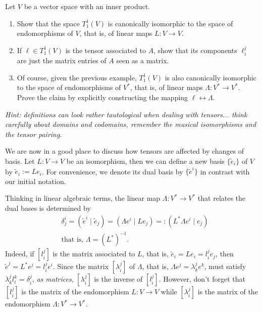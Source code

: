 \begin{exercise}
  Let $V$ be a vector space with an inner product.
  \begin{enumerate}
    \item Show that the space $T^1_1(V)$ is canonically isomorphic to the space of endomorphisms of $V$, that is, of linear maps $L:V\to V$.

    \item If $\ell\in T^1_1(V)$ is the tensor associated to $A$, show that its components $\ell_i^j$ are just the matrix entries of $A$ seen as a matrix.
  
    \item Of course, given the previous example, $T^1_1(V)$ is also canonically isomorphic to the space of endomorphisms of $V^*$, that is, of linear maps $\Lambda:V^*\to V^*$.
    Prove the claim by explicitly constructing the mapping $\ell \leftrightarrow \Lambda$.
  \end{enumerate}
  \textit{\small Hint: definitions can look rather tautological when dealing with tensors... think carefully about domains and codomains, remember the musical isomorphisms and the tensor pairing.}
\end{exercise}

We are now in a good place to discuss how tensors are affected by changes of basis.
Let $L: V\to V$ be an isomorphism, then we can define a new basis $\{\widetilde e_i\}$ of $V$ by $\widetilde e_i := L e_i$. For convenience, we denote its dual basis by $\{\widetilde e^i\}$ in contrast with our initial notation.

Thinking in linear algebraic terms, the linear map $\Lambda:V^*\to V^*$ that relates the dual bases is determined by
\begin{align}
  &\delta^i_j = (\widetilde e^i \mid \widetilde e_j) = (\Lambda e^i \mid L e_j ) =: (L^* \Lambda e^i \mid e_j)\\
  &\mbox{that is, } \Lambda = (L^*)^{-1}.
\end{align}
Indeed, if $[l_i^j]$ is the matrix associated to $L$, that is, $\widetilde e_i = L e_i = l_i^j e_j$, then $\widetilde e^j = L^* e^j = l_i^j e^i$. Since the matrix $[\lambda_i^j]$ of $\Lambda$, that is, $\Lambda e^j = \lambda_k^j e^k$, must satisfy $\lambda_k^j l_i^k= \delta_i^j$, \emph{as matrices}, $[\lambda_i^j]$ is the inverse of $[l_i^j]$. However, don't forget that $[l_i^j]$ is the matrix of the endomorphism $L:V\to V$ while $[\lambda_i^j]$ is the matrix of the endomorphism $\Lambda: V^*\to V^*$.

